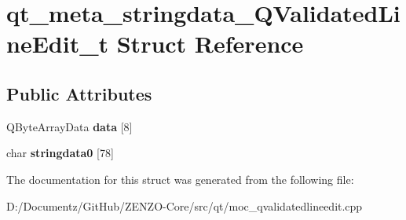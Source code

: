 \hypertarget{structqt__meta__stringdata___q_validated_line_edit__t}{}\section{qt\+\_\+meta\+\_\+stringdata\+\_\+\+Q\+Validated\+Line\+Edit\+\_\+t Struct Reference}
\label{structqt__meta__stringdata___q_validated_line_edit__t}
\subsection*{Public Attributes}
\begin{DoxyCompactItemize}
\item 
\mbox{\label{structqt__meta__stringdata___q_validated_line_edit__t_af3ef05eda4f13379bf7da2779cb25ec0}} 
Q\+Byte\+Array\+Data {\bfseries data} \mbox{[}8\mbox{]}
\item 
\mbox{\label{structqt__meta__stringdata___q_validated_line_edit__t_a43efc7e19ca444ff533660a58aab2e31}} 
char {\bfseries stringdata0} \mbox{[}78\mbox{]}
\end{DoxyCompactItemize}


The documentation for this struct was generated from the following file\+:\begin{DoxyCompactItemize}
\item 
D\+:/\+Documentz/\+Git\+Hub/\+Z\+E\+N\+Z\+O-\/\+Core/src/qt/moc\+\_\+qvalidatedlineedit.\+cpp\end{DoxyCompactItemize}
